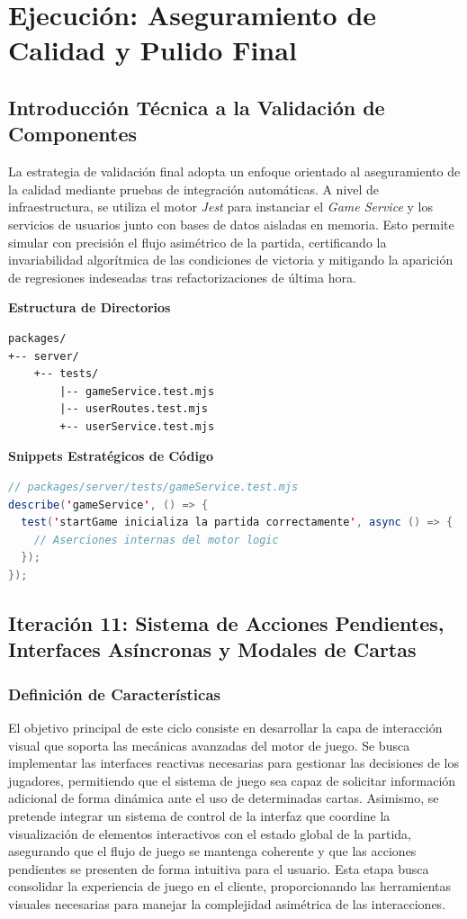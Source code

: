 \part{Ejecución: Aseguramiento de Calidad y Pulido Final}

\chapter{Introducción Técnica a la Validación de Componentes}

La estrategia de validación final adopta un enfoque orientado al aseguramiento de la calidad mediante pruebas de integración automáticas. A nivel de infraestructura, se utiliza el motor \textit{Jest} para instanciar el \textit{Game Service} y los servicios de usuarios junto con bases de datos aisladas en memoria. Esto permite simular con precisión el flujo asimétrico de la partida, certificando la invariabilidad algorítmica de las condiciones de victoria y mitigando la aparición de regresiones indeseadas tras refactorizaciones de última hora.

\textbf{Estructura de Directorios} \\
\begin{verbatim}
packages/
+-- server/
    +-- tests/
        |-- gameService.test.mjs
        |-- userRoutes.test.mjs
        +-- userService.test.mjs
\end{verbatim}

\textbf{Snippets Estratégicos de Código} \\
\begin{lstlisting}[language=Java,breaklines=true]
// packages/server/tests/gameService.test.mjs
describe('gameService', () => {
  test('startGame inicializa la partida correctamente', async () => {
    // Aserciones internas del motor logic
  });
});
\end{lstlisting}

\chapter[Iteración 11: Acciones Pendientes y Modales]{Iteración 11: Sistema de Acciones Pendientes, Interfaces Asíncronas y Modales de Cartas}

\section{Definición de Características}
El objetivo principal de este ciclo consiste en desarrollar la capa de interacción visual que soporta las mecánicas avanzadas del motor de juego. Se busca implementar las interfaces reactivas necesarias para gestionar las decisiones de los jugadores, permitiendo que el sistema de juego sea capaz de solicitar información adicional de forma dinámica ante el uso de determinadas cartas. Asimismo, se pretende integrar un sistema de control de la interfaz que coordine la visualización de elementos interactivos con el estado global de la partida, asegurando que el flujo de juego se mantenga coherente y que las acciones pendientes se presenten de forma intuitiva para el usuario. Esta etapa busca consolidar la experiencia de juego en el cliente, proporcionando las herramientas visuales necesarias para manejar la complejidad asimétrica de las interacciones.

